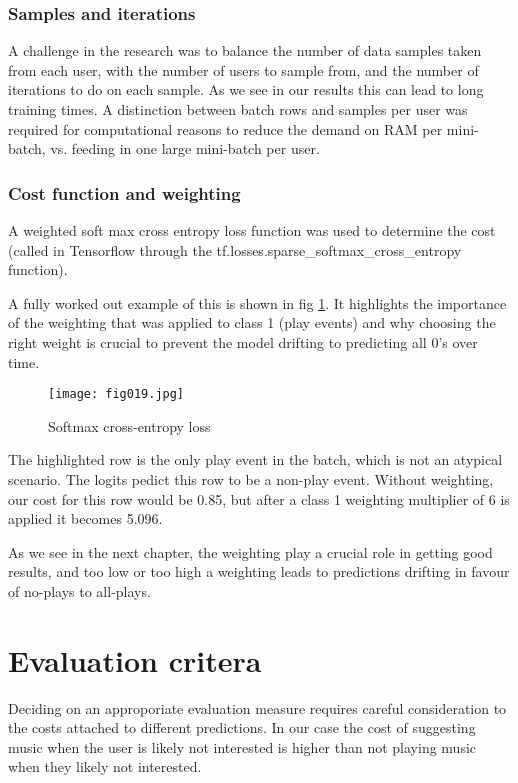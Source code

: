 \subsubsection{Samples and iterations}

A challenge in the research was to balance the number of data samples taken from each user, with the number of users to sample from, and the number of iterations to do on each sample. As we see in our results this can lead to long training times. A distinction between batch rows and samples per user was required for computational reasons to reduce the demand on RAM per mini-batch, vs. feeding in one large mini-batch per user.

\subsubsection{Cost function and weighting}

A weighted soft max cross entropy loss function was used to determine the cost (called in Tensorflow through the tf.losses.sparse\_softmax\_cross\_entropy function). 

A fully worked out example of this is shown in fig \ref{fig19}. It highlights the importance of the weighting that was applied to class 1 (play events) and why choosing the right weight is crucial to prevent the model drifting to predicting all 0's over time. 
 
\begin{figure}[h!]
	\centering
	\texttt{[image: fig019.jpg]}
	\caption{Softmax cross-entropy loss}
	\label{fig19}
\end{figure} 
	
The highlighted row is the only play event in the batch, which is not an atypical scenario. The logits pedict this row to be a non-play event. Without weighting, our cost for this row would be 0.85, but after a class 1 weighting multiplier of 6 is applied it becomes 5.096. 

As we see in the next chapter, the weighting play a crucial role in getting good results, and too low or too high a weighting leads to predictions drifting in favour of no-plays to all-plays.

\section{Evaluation critera}

Deciding on an approporiate evaluation measure requires careful consideration to the costs attached to different predictions. In our case the cost of suggesting music when the user is likely not interested is higher than not playing music when they likely not interested. 

